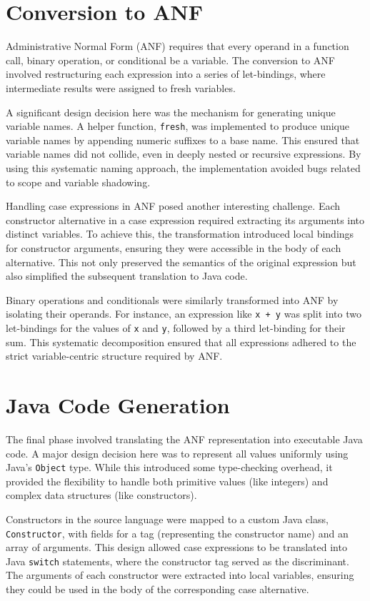\section{Conversion to ANF}
Administrative Normal Form (ANF) requires that every operand in a function
call, binary operation, or conditional be a variable. The conversion to ANF
involved restructuring each expression into a series of let-bindings, where
intermediate results were assigned to fresh variables.

A significant design decision here was the mechanism for generating unique variable names. A helper function, \texttt{fresh}, was implemented to produce unique variable names by appending numeric suffixes to a base name. This ensured that variable names did not collide, even in deeply nested or recursive expressions. By using this systematic naming approach, the implementation avoided bugs related to scope and variable shadowing.

Handling case expressions in ANF posed another interesting challenge. Each constructor alternative in a case expression required extracting its arguments into distinct variables. To achieve this, the transformation introduced local bindings for constructor arguments, ensuring they were accessible in the body of each alternative. This not only preserved the semantics of the original expression but also simplified the subsequent translation to Java code.

Binary operations and conditionals were similarly transformed into ANF by isolating their operands. For instance, an expression like \texttt{x + y} was split into two let-bindings for the values of \texttt{x} and \texttt{y}, followed by a third let-binding for their sum. This systematic decomposition ensured that all expressions adhered to the strict variable-centric structure required by ANF.
\section{Java Code Generation}
The final phase involved translating the ANF representation into executable Java code. A major design decision here was to represent all values uniformly using Java's \texttt{Object} type. While this introduced some type-checking overhead, it provided the flexibility to handle both primitive values (like integers) and complex data structures (like constructors).

Constructors in the source language were mapped to a custom Java class, \texttt{Constructor}, with fields for a tag (representing the constructor name) and an array of arguments. This design allowed case expressions to be translated into Java \texttt{switch} statements, where the constructor tag served as the discriminant. The arguments of each constructor were extracted into local variables, ensuring they could be used in the body of the corresponding case alternative.

